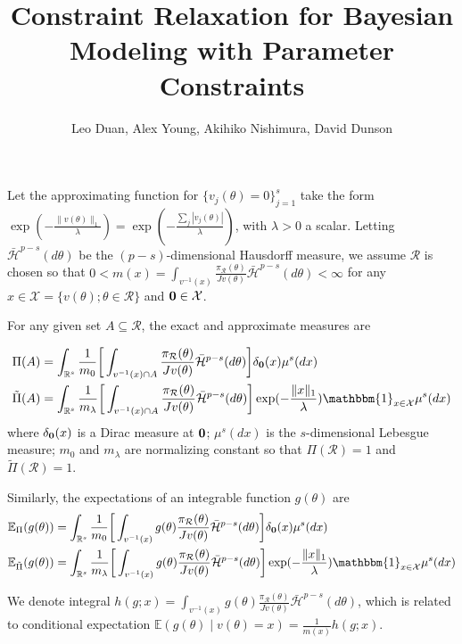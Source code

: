 \documentclass[10pt,fleqn]{article}
\title{\textbf{Constraint Relaxation for Bayesian Modeling with Parameter Constraints}}
\author{Leo Duan,  Alex Young, Akihiko Nishimura, David Dunson}
\date{}
\newcommand{\be}{\begin{equation}\begin{aligned}}
\newcommand{\ee}{\end{aligned}\end{equation}}
\newcommand{\bb}[1]{\mathbb{#1}}
\newcommand{\mc}[1]{\mathcal{#1}}
\DeclareMathOperator{\1}{\mathbbm{1}}
\begin{document}
\maketitle
{}

Let the approximating function for $\{v_{j}(\theta)=0\}_{j=1}^s$ take the form
$\exp(-\frac{ \|v(\theta)\|_1}{\lambda})=\exp(-\frac{ \sum_j|v_j(\theta)|}{\lambda})$, with $\lambda >0$ a scalar. Letting $\bar{\mc H}^{p-s}(d \theta)$ be the $(p-s)$-dimensional
 Hausdorff measure, 
we assume $\mc R$ is chosen so that   $0< m(x)
=\int_{v^{-1}(x)}\frac{\pi_{\mc R}(\theta)}{Jv(\theta)}  \bar{\mc H}^{p-s}(d \theta) <\infty$ for any $x\in \mathcal X =\{v(\theta);\theta\in \mc R\}$
and $\bf 0 \in \mc X$.



 
For any given set $A \subseteq \mc R $, the exact and approximate measures are

\be
\Pi(A) & =\int_{\mathbb R^s} \frac{1}{m_0}\bigg[\int_{v^{-1}({x}) \cap A}\frac{\pi_{\mc R}(\theta)}{Jv(\theta)}  \bar{\mc H}^{p-s}(d \theta)\bigg] \delta_{\bf 0}(x)\mu^{s}(dx)
\\
\tilde\Pi(A) &=\int_{\mathbb R^s} \frac{1}{m_\lambda}\bigg[\int_{v^{-1}(x) \cap A} \frac{\pi_{\mc R}(\theta)}{Jv(\theta)}  \bar{\mc H}^{p-s}(d \theta)
\bigg] \exp(-\frac{\|x\|_1}{\lambda})\mathbbm{1}_{x\in
\mathcal X}\mu^{s}(dx)
\ee
 where $\delta_{\bf 0}(x)$ is a Dirac measure at $\bf 0$; $\mu^{s}(dx)$ is the
 $s$-dimensional Lebesgue measure; $m_0$ and $m_\lambda$ are normalizing constant so that
 $\Pi(\mc R)=1$ and $\tilde\Pi(\mc R)=1$.

Similarly, the expectations of an integrable function
 $g(\theta)$ are
 \be
\bb E_{\Pi}(g(\theta)) & =\int_{\mathbb R^s} \frac{1}{m_0}\bigg[\int_{v^{-1}(x) } g(\theta)\frac{\pi_{\mc R}(\theta)}{Jv(\theta)}  \bar{\mc H}^{p-s}(d \theta)\bigg] \delta_{\bf 0}(x)\mu^{s}(dx)\\
\bb E_{\tilde \Pi}(g(\theta)) &=\int_{\mathbb R^s} \frac{1}{m_\lambda}\bigg[\int_{v^{-1}(x) }g(\theta) \frac{\pi_{\mc R}(\theta)}{Jv(\theta)}  \bar{\mc H}^{p-s}(d \theta)
\bigg] \exp(-\frac{\|x\|_1}{\lambda})\mathbbm{1}_{x\in
\mathcal X}\mu^{s}(dx)
\ee


We denote integral $h(g;x)=\int_{v^{-1}(x) } g(\theta)\frac{\pi_{\mc R}(\theta)}{Jv(\theta)}  \bar{\mc H}^{p-s}(d \theta)$, which is related to
conditional expectation $\bb E(g(\theta)\mid v(\theta)=x) =\frac{1}{m(x)}h(g;x)$.  

 
 
\end{document}
